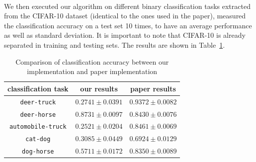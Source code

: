 \documentclass[11 pt]{article}
\begin{document}
\paragraph{}We then executed our algorithm on different binary classification tasks extracted from the CIFAR-10 dataset (identical to the ones used in the paper), measured the classification accuracy on a test set 10 times, to have an average performance as well as standard deviation. It is important to note that CIFAR-10 is already separated in training and testing sets. The results are shown in Table~\ref{table:res}.

\begin{table}[t]
	\centering
	  \begin{tabular}{c c c}
			\toprule
			  classification task &our results &paper results \\
		  \midrule
			\texttt{deer-truck} & $\mathbf{0.2741\pm0.0391}$ & $0.9372 \pm 0.0082$ \\
			\texttt{deer-horse} & $\mathbf{0.8731 \pm0.0097}$ & $0.8430 \pm 0.0076$ \\
			\texttt{automobile-truck} & $\mathbf{0.2521 \pm0.0204}$ & $0.8461 \pm 0.0069$\\
		  \texttt{cat-dog} & $\mathbf{ 0.3085\pm0.0449}$ & $0.6924 \pm 0.0129$\\
		  \texttt{dog-horse} & $\mathbf{0.5711 \pm0.0172}$ & $0.8350 \pm 0.0089$\\
			\bottomrule
	  \end{tabular}
	  \caption{Comparison of classification accuracy between our implementation and paper implementation}
	  \label{table:res}
  \end{table}

\end{document}
